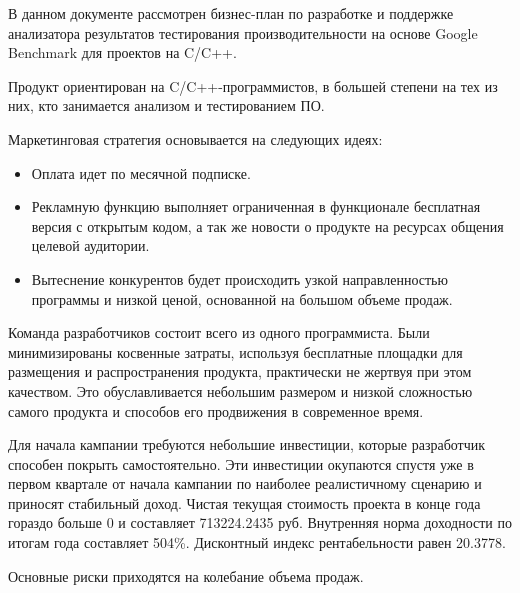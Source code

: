 В данном документе рассмотрен бизнес-план по разработке и поддержке анализатора результатов тестирования производительности на основе Google Benchmark для проектов на C/C++.

Продукт ориентирован на C/C++-программистов, в большей степени на тех из них, кто занимается анализом и тестированием ПО.

Маркетинговая стратегия основывается на следующих идеях:
\begin{itemize}
	\item Оплата идет по месячной подписке.
	\item Рекламную функцию выполняет ограниченная в функционале бесплатная версия с открытым кодом, а так же новости о продукте на ресурсах общения целевой аудитории.
	\item Вытеснение конкурентов будет происходить узкой направленностью программы и низкой ценой, основанной на большом объеме продаж.
\end{itemize}

Команда разработчиков состоит всего из одного программиста. Были минимизированы косвенные затраты, используя бесплатные площадки для размещения и распространения продукта, практически не жертвуя при этом качеством. Это обуславливается небольшим размером и низкой сложностью самого продукта и способов его продвижения в современное время.

Для начала кампании требуются небольшие инвестиции, которые разработчик способен покрыть самостоятельно. Эти инвестиции окупаются спустя уже в первом квартале от начала кампании по наиболее реалистичному сценарию и приносят стабильный доход. Чистая текущая стоимость проекта в конце года гораздо больше 0 и составляет 713224.2435 руб. Внутренняя норма доходности по итогам года составляет 504\%. Дисконтный индекс рентабельности равен 20.3778.

Основные риски приходятся на колебание объема продаж.